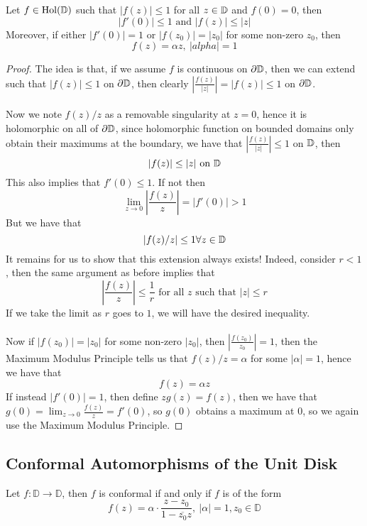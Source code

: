 \begin{lemma}
    Let $f \in \text{Hol}(\mathbb{D})$ such that $|f(z)| \leq 1$ for all $z \in \mathbb{D}$ and $f(0) = 0$, then
    \[|f'(0)| \leq 1 \text{ and } |f(z)| \leq |z|\]
    Moreover, if either $|f'(0)| = 1$ or $|f(z_0)| = |z_0|$ for some non-zero $z_0$, then
    \[f(z) = \alpha z, \ |alpha| = 1\]
\end{lemma}

\begin{proof}
    The idea is that, if we assume $f$ is continuous on $\partial \mathbb{D}$, then we can extend such that $|f(z)| \leq 1$ on $\partial \mathbb{D}$, then clearly $|\frac{f(z)}{|z|}| = |f(z)| \leq 1$ on $\partial \mathbb{D}$.\\\\
    Now we note $f(z)/z$ as a removable singularity at $z = 0$, hence it is holomorphic on all of $\partial \mathbb{D}$, since holomorphic function on bounded domains only obtain their maximums at the boundary, we have that $|\frac{f(z)}{|z|}| \leq 1$ on $\mathbb{D}$, then
    \[|f(z)| \leq |z| \text{ on $\mathbb{D}$}\]
     This also implies that $f'(0) \leq 1$. If not then
    \[\lim_{z \to 0} |\frac{f(z)}{z}| = |f'(0)| > 1\]
    But we have that 
    \[|f(z)/z| \leq 1 \forall z \in \mathbb{D}\]
    It remains for us to show that this extension always exists! Indeed, consider $r < 1$, then the same argument as before implies that
    \[|\frac{f(z)}{z}| \leq \frac{1}{r} \text{ for all $z$ such that $|z| \leq r$}\]
    If we take the limit as $r$ goes to $1$, we will have the desired inequality.\\\\
    Now if $|f(z_0)| = |z_0|$ for some non-zero $|z_0|$, then $|\frac{f(z_0)}{z_0}| = 1$, then the Maximum Modulus Principle tells us that $f(z)/z = \alpha$ for some $|\alpha| = 1$, hence we have that
    \[f(z) = \alpha z\]
    If instead $|f'(0)| = 1$, then define $z g(z) = f(z)$, then we have that $g(0) = \lim_{z \to 0} \frac{f(z)}{z} = f'(0)$, so $g(0)$ obtains a maximum at $0$, so we again use the Maximum Modulus Principle.
\end{proof}

\subsection{Conformal Automorphisms of the Unit Disk}

\begin{theorem}
    Let $f: \mathbb{D} \to \mathbb{D}$, then $f$ is conformal if and only if $f$ is of the form
    \[f(z) = \alpha \cdot \frac{z - z_0}{1 - \overline{z_0} z},\ |\alpha| = 1, z_0 \in \mathbb{D}\]
\end{theorem}

